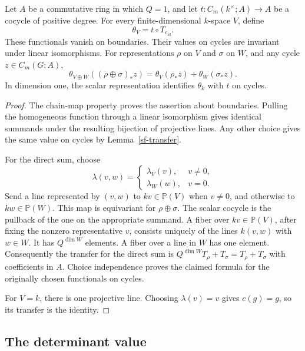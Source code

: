 \begin{proposition}\label{sf-additive-transfer}
Let \(A\) be a commutative ring in which \(Q=1\),
and let \(t:C_m(k^\times;A)\to A\) be a cocycle
of positive degree.  For every finite-dimensional
\(k\)-space \(V\), define
\[
                    \theta_V=t\circ T_{c_{\mathrm{id}}}.
\]
These functionals vanish on boundaries.  Their values
on cycles are invariant under linear isomorphisms.
For representations \(\rho\) on \(V\) and \(\sigma\)
on \(W\), and any cycle \(z\in C_m(G;A)\),
\[
 \theta_{V\oplus W}((\rho\oplus\sigma)_*z)
       =\theta_V(\rho_*z)+\theta_W(\sigma_*z).
\]
In dimension one, the scalar representation identifies
\(\theta_k\) with \(t\) on cycles.
\end{proposition}
\begin{proof}
The chain-map property proves the assertion about
boundaries.  Pulling the homogeneous function through
a linear isomorphism gives identical summands under
the resulting bijection of projective lines.
Any other choice gives the same value on cycles by
Lemma~\ref{sf-transfer}.

For the direct sum, choose
\[
 \lambda(v,w)=
 \begin{cases}
     \lambda_V(v),&v\ne0,\\
     \lambda_W(w),&v=0.
 \end{cases}
\]
Send a line represented by \((v,w)\) to \(kv\in\mathbb P(V)\)
when \(v\ne0\), and otherwise to \(kw\in\mathbb P(W)\).
This map is equivariant for \(\rho\oplus\sigma\).
The scalar cocycle is the pullback of the one on
the appropriate summand.
A fiber over \(kv\in\mathbb P(V)\), after fixing
the nonzero representative \(v\), consists uniquely
of the lines \(k(v,w)\) with \(w\in W\).
It has \(Q^{\dim W}\) elements.
A fiber over a line in \(W\) has one element.
Consequently the transfer for the direct sum is
\(Q^{\dim W}T_\rho+T_\sigma=T_\rho+T_\sigma\)
with coefficients in \(A\).
Choice independence proves the claimed formula for
the originally chosen functionals on cycles.

For \(V=k\), there is one projective line.
Choosing \(\lambda(v)=v\) gives
\(c(g)=g\), so its transfer is the identity.
\end{proof}

\subsection{The determinant value}

